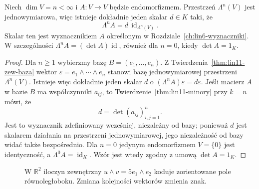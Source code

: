 \begin{twierdzenie}
\label{thm:lin11-det-wedge}
Niech \(\dim V=n<\infty\) i
\(A\colon V\to V\) będzie
endomorfizmem. Przestrzeń
\(\Lambda^n(V)\) jest jednowymiarowa,
więc istnieje dokładnie jeden
skalar \(d\in K\) taki, że
\[
 \Lambda^n A=d\,
   \operatorname{id}_{\Lambda^n(V)}.
\]
Skalar ten jest wyznacznikiem
\(A\) określonym w
Rozdziale~\ref{ch:lin6-wyznaczniki}.
W szczególności
\(\Lambda^n A=(\det A)\operatorname{id}\),
również dla \(n=0\), kiedy
\(\det A=1_K\).
\end{twierdzenie}
\begin{proof}
Dla \(n\ge1\) wybierzmy
bazę \(B=(e_1,\ldots,e_n)\).
Z
Twierdzenia~\ref{thm:lin11-zew-baza}
wektor
\(\varepsilon=e_1\wedge\cdots\wedge e_n\)
stanowi bazę jednowymiarowej
przestrzeni \(\Lambda^n(V)\).
Istnieje więc dokładnie
jeden skalar \(d\) o
\((\Lambda^n A)\varepsilon=d\varepsilon\).
Jeśli macierz \(A\) w bazie \(B\)
ma współczynniki \(a_{ij}\),
to
Twierdzenie~\ref{thm:lin11-minory}
przy \(k=n\) mówi, że
\[
 d=\det(a_{ij})_{i,j=1}^n.
\]
Jest to wyznacznik
zdefiniowany wcześniej,
niezależny od bazy;
ponieważ \(d\) jest skalarem
działania na przestrzeni
jednowymiarowej, jego
niezależność od bazy
widać także bezpośrednio.
Dla \(n=0\) jedynym
endomorfizmem \(V=\{0\}\)
jest identyczność,
a \(\Lambda^0 A=\operatorname{id}_K\).
Wzór jest wtedy zgodny
z umową \(\det A=1_K\).
\end{proof}

\begin{figure}[!htbp]
\centering
{}
\caption{W \(\mathbb R^2\) iloczyn zewnętrzny
\(u\wedge v=5e_1\wedge e_2\)
koduje zorientowane pole równoległoboku.
Zmiana kolejności wektorów zmienia znak.}
\label{fig:lin11-wedge-pole}
\end{figure}

